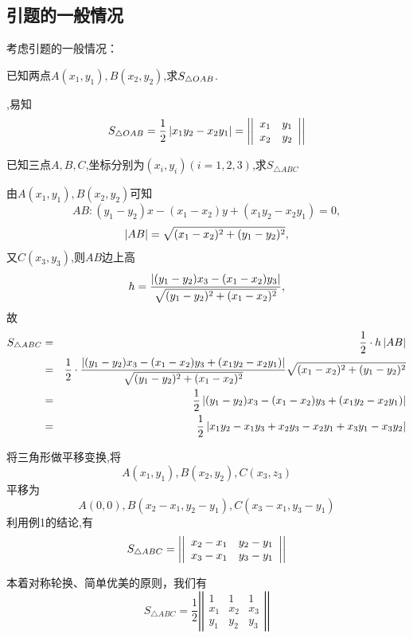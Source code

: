 \subsection{引题的一般情况}
考虑引题的一般情况：

\prob 已知两点$A(x_1,y_1),B(x_2,y_2)$,求$\displaystyle S_{\triangle OAB}$.

,易知
$$
S_{\triangle OAB}=\frac{1}{2}\left| {x_1y_2-x_2y_1} \right|
=\left| {\left| {\begin{array}{cc}
  x_1&y_1\\
  x_2&y_2\\ 
\end{array}} \right|} \right|
$$
\solend

\prob 已知三点$A,B,C$,坐标分别为$(x_i,y_i)(i=1,2,3)$,求$S_{\triangle ABC}$

由$A(x_1,y_1),B(x_2,y_2)$可知
$$AB:(y_1-y_2)x-(x_1-x_2)y+(x_1y_2-x_2y_1)=0,$$
$$\left| {AB} \right|=\sqrt{(x_1-x_2)^2+(y_1-y_2)^2},$$
又$C(x_3,y_3)$,则$AB$边上高
$$h=\frac{\left| {(y_1-y_2)x_3-(x_1-x_2)y_3} \right|}
{\sqrt{(y_1-y_2)^2+(x_1-x_2)^2}},$$
故
\begin{eqnarray}
  S_{\triangle ABC}&=&\frac{1}{2}\cdot h \left| {AB} \right|\nonumber\\
  &=&\frac{1}{2}\cdot \frac{\left| {(y_1-y_2)x_3-(x_1-x_2)y_3+(x_1y_2-x_2y_1)} \right|}
    {\sqrt{(y_1-y_2)^2+(x_1-x_2)^2}}
    \sqrt{(x_1-x_2)^2+(y_1-y_2)^2}\nonumber\\
  &=&\frac{1}{2}\left| {(y_1-y_2)x_3-(x_1-x_2)y_3+(x_1y_2-x_2y_1)} \right|\nonumber\\
  &=&\frac{1}{2}\left| {x_1y_2-x_1y_3+x_2y_3-x_2y_1+x_3y_1-x_3y_2} \right|\nonumber
\end{eqnarray}
\solend

\sol 将三角形做平移变换,将
$$ A(x_1,y_1),B(x_2,y_2),C(x_3,z_3)$$
平移为
$$A(0,0),B(x_2-x_1,y_2-y_1),C(x_3-x_1,y_3-y_1)$$
利用例1的结论,有
$$S_{\triangle ABC}=
\left| {\left| {\begin{array}{cc}
  x_2-x_1&y_2-y_1\\
  x_3-x_1&y_3-y_1\\ 
\end{array}} \right|} \right|
$$
\solend

本着对称轮换、简单优美的原则，我们有$$S_{\triangle ABC}=
\frac{1}{2}\left|\left|\begin{array}{ccc}
    1 & 1 & 1 \\
    x_1 & x_2 & x_3 \\  
    y_1 & y_2 & y_3 
  \end{array}\right|\right|
$$

